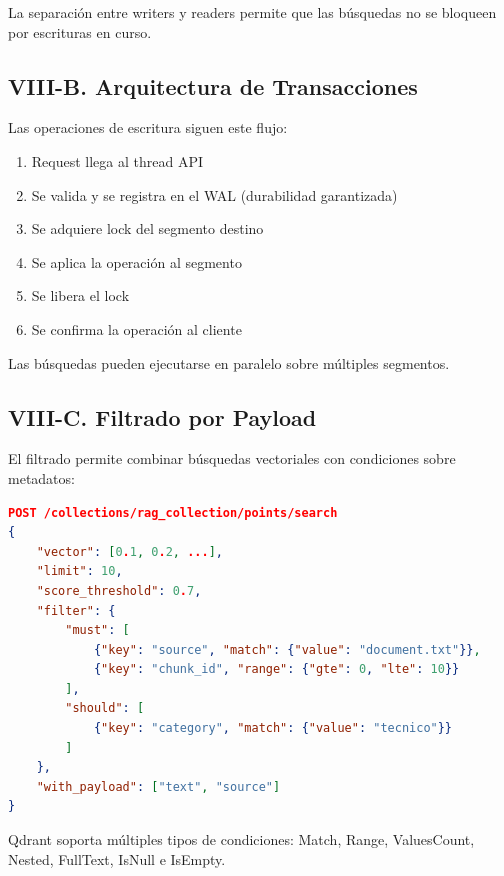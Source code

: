 \documentclass[conference]{IEEEtran}
\begin{document}
La separación entre writers y readers permite que las búsquedas no se bloqueen por escrituras en curso.

\subsection{VIII-B. Arquitectura de Transacciones}

Las operaciones de escritura siguen este flujo:

\begin{enumerate}
    \item Request llega al thread API
    \item Se valida y se registra en el WAL (durabilidad garantizada)
    \item Se adquiere lock del segmento destino
    \item Se aplica la operación al segmento
    \item Se libera el lock
    \item Se confirma la operación al cliente
\end{enumerate}

Las búsquedas pueden ejecutarse en paralelo sobre múltiples segmentos.

\subsection{VIII-C. Filtrado por Payload}

El filtrado permite combinar búsquedas vectoriales con condiciones sobre metadatos:

\begin{lstlisting}[language=json, caption={Ejemplo de búsqueda con filtrado}, label={lst:filter}]
POST /collections/rag_collection/points/search
{
    "vector": [0.1, 0.2, ...],
    "limit": 10,
    "score_threshold": 0.7,
    "filter": {
        "must": [
            {"key": "source", "match": {"value": "document.txt"}},
            {"key": "chunk_id", "range": {"gte": 0, "lte": 10}}
        ],
        "should": [
            {"key": "category", "match": {"value": "tecnico"}}
        ]
    },
    "with_payload": ["text", "source"]
}
\end{lstlisting}

Qdrant soporta múltiples tipos de condiciones: Match, Range, ValuesCount, Nested, FullText, IsNull e IsEmpty.

\end{document}
